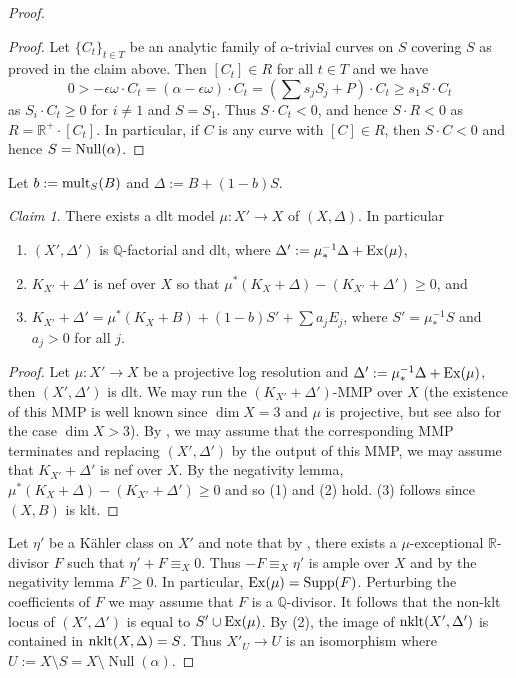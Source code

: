\documentclass[12pt]{amsart}
\theoremstyle{plain}
\theoremstyle{remark}
\theoremstyle{definition}
\def\Null{\operatorname{Null}}
\newcommand{\<}{\leq}
\newcommand{\mbQ}{\mathbb{Q}}
\newcommand{\mbR}{\mathbb{R}}
\newcommand{\Q}{{\mathbb{Q}}}
\def\dim{\operatorname{dim}}
\theoremstyle{definition}
\theoremstyle{definition}
\numberwithin{equation}{section}
\theoremstyle{remark}
\newtheorem{claim}[theorem]{Claim}
\begin{document}
\begin{proof}
\begin{proof}
    
Let $\{C_t\}_{t\in T}$ be an analytic family of $\alpha$-trivial curves on $S$ covering $S$ as proved in the claim above. Then $[C_t]\in R$ for all $t\in T$ and we have
\[0>-\epsilon \omega\cdot C_t =(\alpha -\epsilon \omega)\cdot C_t =\left(\sum s_jS_j+P\right)\cdot C_t\geq s_{1}S\cdot C_t\]
as $S_i\cdot C_t\geq 0$ for $i\neq 1 $ and $S=S_1$. Thus $S\cdot C_t<0$, and hence $S\cdot R<0$ as $R=\mbR^+\cdot[C_t]$. In particular, if $C$ is any curve with $[C]\in R$, then $S\cdot C<0$ and hence $S={\rm Null}(\alpha)$.
\end{proof}
 Let $b:={\rm mult}_S(B)$ and $\Delta:=B+(1-b)S$. 
 \begin{claim} There exists a dlt model $\mu :X'\to X$ of $(X,\Delta)$. In particular 
\begin{enumerate}
    \item $(X',\Delta ')$ is $\Q$-factorial and dlt, where $\Delta':=\mu ^{-1}_*\Delta +{\rm Ex}(\mu)$, 
    \item $K_{X'}+\Delta '$ is nef over $X$ so that $\mu ^*(K_X+\Delta )-(K_{X'}+\Delta ')\geq 0$, and
    \item $K_{X'}+\Delta '=\mu ^*(K_X+B)+(1-b)S'+\sum a_jE_j$, where $S'=\mu ^{-1}_*S$ and $a_j>0$ for all $j$. 
    \end{enumerate}
    \end{claim}
    \begin{proof}
        Let $\mu :X'\to X$ be a projective log resolution and $\Delta':=\mu ^{-1}_*\Delta +{\rm Ex}(\mu)$, then $(X',\Delta ')$ is dlt. We may run the $(K_{X'}+\Delta ')$-MMP over $X$ (the existence of this MMP is well known since $\dim X=3$ and $\mu$ is projective, but see also \cite[Theorem 1.4]{DHP22} for the case $\dim X>3$). By \cite[Theorem 3.3]{DO23}, we may assume that the corresponding MMP terminates and replacing $(X',\Delta ')$ by the output of this MMP, we may assume that $K_{X'}+\Delta '$ is nef over $X$.
        By the negativity lemma, $\mu ^*(K_X+\Delta )-(K_{X'}+\Delta ')\geq 0$ and so (1) and (2) hold.
        (3) follows since $(X,B)$ is klt.
        
    \end{proof}

Let $\eta'$ be a K\"ahler class on $X'$ and note that by \cite[Lemma 2.27]{DH20}, there exists a $\mu$-exceptional $\mbR$-divisor $F$ such that $\eta'+F\equiv _X0$. Thus $-F\equiv_X \eta '$ is ample over $X$ and by the negativity lemma $F\geq 0$. In particular, ${\rm Ex}(\mu)={\rm Supp}(F)$. Perturbing the coefficients of $F$ we may assume that $F$ is a $\mbQ$-divisor. It follows that the non-klt locus of $(X',\Delta ')$ is equal to $S'\cup {\rm Ex}(\mu)$. By (2), the image of ${\rm nklt}(X',\Delta ')$ is contained in ${\rm nklt}(X,\Delta )=S$. Thus $X'_U\to U$  is an isomorphism where $U:=X\setminus S=X\setminus\Null(\alpha)$.


\end{proof}
\end{document}
